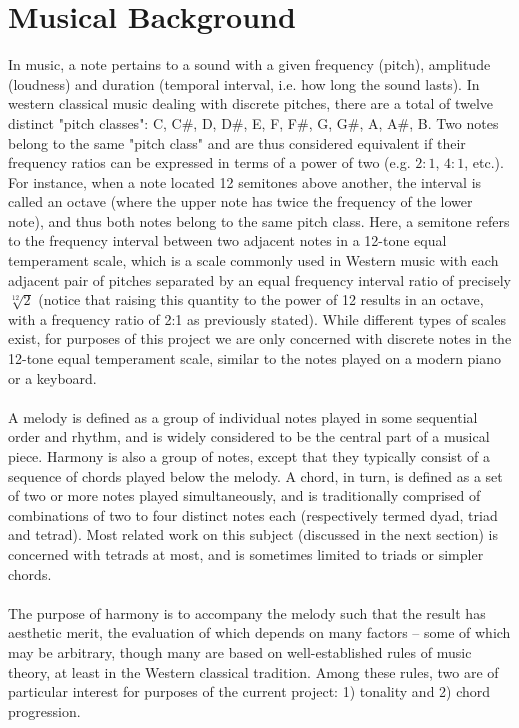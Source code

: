 \documentclass[twoside]{article}
\begin{document}
	\section{Musical Background}
	In music, a note pertains to a sound with a given frequency (pitch), amplitude (loudness) and duration (temporal interval, i.e. how long the sound lasts). In western classical music dealing with discrete pitches, there are a total of twelve distinct "pitch classes": C, C\#, D, D\#, E, F, F\#, G, G\#, A, A\#, B. Two notes belong to the same "pitch class" and are thus considered equivalent if their frequency ratios can be expressed in terms of a power of two (e.g. $2:1$, $4:1$, etc.). For instance, when a note located 12 semitones above another, the interval is called an octave (where the upper note has twice the frequency of the lower note), and thus both notes belong to the same pitch class. Here, a semitone refers to the frequency interval between two adjacent notes in a 12-tone equal temperament scale, which is a scale commonly used in Western music with each adjacent pair of pitches separated by an equal frequency interval ratio of precisely $\sqrt[12]{2}$ (notice that raising this quantity to the power of 12 results in an octave, with a frequency ratio of 2:1 as previously stated). While different types of scales  exist, for purposes of this project we are only concerned with discrete notes in the 12-tone equal temperament scale, similar to the notes played on a modern piano or a keyboard.
	\\\\
	A melody is defined as a group of individual notes played in some sequential order and rhythm, and is widely considered to be the central part of a musical piece. Harmony is also a group of notes, except that they typically consist of a sequence of chords played below the melody. A chord, in turn, is defined as a set of two or more notes played simultaneously, and is traditionally comprised of combinations of two to four distinct notes each (respectively termed dyad, triad and tetrad). Most related work on this subject (discussed in the next section) is concerned with tetrads at most, and is sometimes limited to triads or simpler chords.
	\\\\
	The purpose of harmony is to accompany the melody such that the result has aesthetic merit, the evaluation of which depends on many factors -- some of which may be arbitrary, though many are based on well-established rules of music theory, at least in the Western classical tradition. Among these rules, two are of particular interest for purposes of the current project: 1) tonality and 2) chord progression. 
\end{document}
